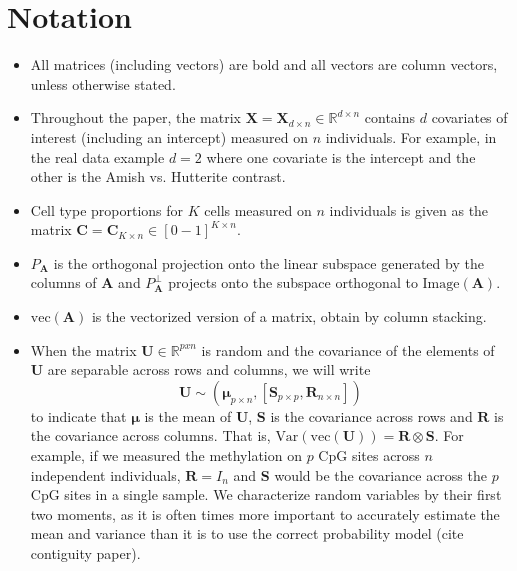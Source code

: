 \documentclass{article}
\begin{document}
\section{Notation}
\begin{itemize}
\item All matrices (including vectors) are bold and all vectors are column vectors, unless otherwise stated.
\item Throughout the paper, the matrix $\bm{X} = \bm{X}_{d \times n} \in \mathbb{R}^{d \times n}$ contains $d$ covariates of interest (including an intercept) measured on $n$ individuals. For example, in the real data example $d = 2$ where one covariate is the intercept and the other is the Amish vs. Hutterite contrast.
\item Cell type proportions for $K$ cells measured on $n$ individuals is given as the matrix $\bm{C} = \bm{C}_{K \times n} \in [0-1]^{K \times n}$.
\item $P_{\bm{A}}$ is the orthogonal projection onto the linear subspace generated by the columns of $\bm{A}$ and $P_{\bm{A}}^{\perp}$ projects onto the subspace orthogonal to $\text{Image}\left( \bm{A} \right)$.
\item $\text{vec}\left( \bm{A} \right)$ is the vectorized version of a matrix, obtain by column stacking.
\item When the matrix $\bm{U} \in \mathbb{R}^{p x n}$ is random and the covariance of the elements of $\bm{U}$ are separable across rows and columns, we will write
\[
\bm{U} \sim \left( \bm{\mu}_{p \times n}, \left[ \bm{S}_{p \times p}, \bm{R}_{n \times n} \right] \right)
\]
to indicate that $\bm{\mu}$ is the mean of $\bm{U}$, $\bm{S}$ is the covariance across rows and $\bm{R}$ is the covariance across columns. That is, $\text{Var}\left( \text{vec}\left( \bm{U} \right) \right) = \bm{R} \otimes \bm{S}$. For example, if we measured the methylation on $p$ CpG sites across $n$ independent individuals, $\bm{R} = I_n$ and $\bm{S}$ would be the covariance across the $p$ CpG sites in a single sample. We characterize random variables by their first two moments, as it is often times more important to accurately estimate the mean and variance than it is to use the correct probability model (cite contiguity paper).

\end{itemize}
\end{document}
